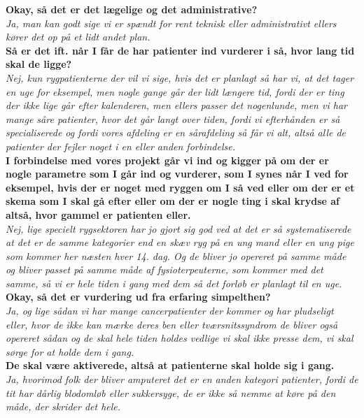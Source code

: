 \noindent
\textbf{Okay, så det er det lægelige og det administrative?}\\
\noindent
\textit{Ja, man kan godt sige vi er spændt for rent teknisk eller administrativt ellers kører det op på et lidt andet plan.}\\
\noindent
\textbf{Så er det ift. når I får de har patienter ind vurderer i så, hvor lang tid skal de ligge?}\\
\noindent
\textit{Nej,  kun rygpatienterne der vil vi sige, hvis det er planlagt så har vi,  at det tager en uge for eksempel, men nogle gange går der lidt længere tid, fordi der er ting der ikke lige går efter kalenderen, men ellers passer det nogenlunde, men vi har mange såre patienter, hvor det går langt over tiden, fordi vi efterhånden er så specialiserede og fordi vores afdeling er en sårafdeling så får vi alt, altså alle de patienter der fejler noget i en eller anden  forbindelse.}\\
\noindent
\textbf{I forbindelse med vores projekt går vi ind og kigger på om der er nogle parametre som I går ind og vurderer, som I synes når I ved for eksempel, hvis der er noget med ryggen om I så ved eller om der er et skema som I skal gå efter eller om der er nogle ting i skal krydse af altså, hvor gammel er patienten eller.}\\
\noindent
\textit{Nej, lige specielt rygsektoren har jo gjort sig god ved at det er så systematiserede at det er de samme kategorier end en skæv ryg på en ung mand eller en ung pige som kommer her næsten hver 14. dag. Og de bliver jo opereret på samme måde og bliver passet på samme måde af fysioterpeuterne, som kommer med det samme, så vi er hele tiden i gang med dem så det forløb er planlagt til en uge.}\\
\noindent
\textbf{Okay, så det er vurdering ud fra erfaring simpelthen?}\\
\noindent
\textit{Ja, og lige sådan vi har mange cancerpatienter der kommer og har pludseligt eller, hvor de ikke kan mærke deres ben eller tværsnitssyndrom de bliver også opereret sådan og de skal hele tiden holdes vedlige vi skal ikke presse dem, vi skal sørge for at holde dem i gang.}\\
\noindent
\textbf{De skal være aktiverede, altså at patienterne skal holde sig i gang.}\\
\noindent
\textit{Ja, hvorimod folk der bliver amputeret det er en anden kategori patienter, fordi de tit har dårlig blodomløb eller sukkersyge, de er ikke så nemme at køre på den måde, der skrider det hele.}\\

